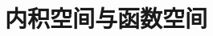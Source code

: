 \documentclass[12pt,a4paper]{article}
\renewcommand*{\vec}[1]{\bm{#1}}%
\renewcommand{\[}{\ $\displaystyle}
\renewcommand{\]}{$\ }%
\newcommand{\summ}[2][n]{\sum_{#1=#2}^\infty}
\begin{document}
\section{内积空间与函数空间}
%	 
\end{document}
